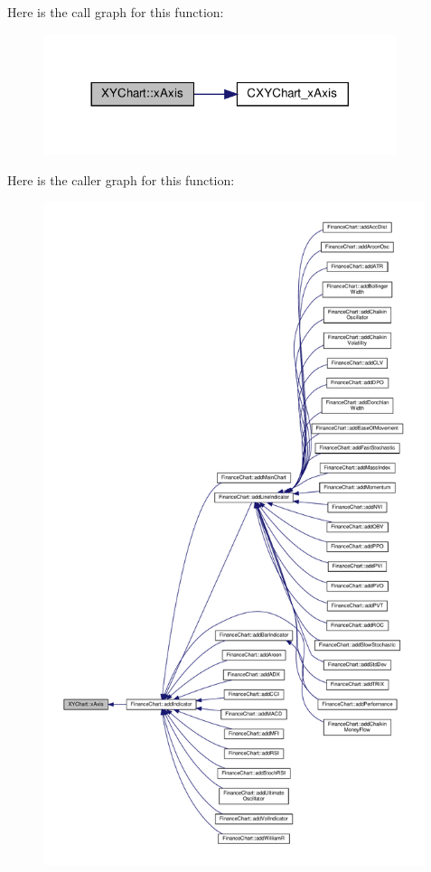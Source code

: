 Here is the call graph for this function\+:
\nopagebreak
\begin{figure}[H]
\begin{center}
\leavevmode
\includegraphics[width=293pt]{class_x_y_chart_a4ae44126c336029899db3b70ee92b5f8_cgraph}
\end{center}
\end{figure}
Here is the caller graph for this function\+:
\nopagebreak
\begin{figure}[H]
\begin{center}
\leavevmode
\includegraphics[height=550pt]{class_x_y_chart_a4ae44126c336029899db3b70ee92b5f8_icgraph}
\end{center}
\end{figure}
\mbox{\label{class_x_y_chart_a9883db03a403936680d0c57bdd16eb94}} 

